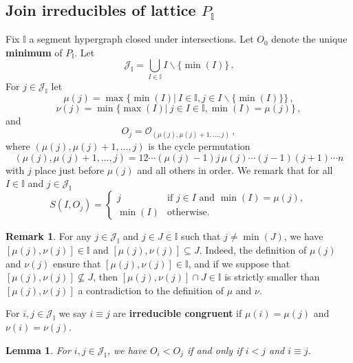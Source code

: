 \documentclass[reqno]{amsart}
\newtheorem{lemma}[theorem]{Lemma}
\theoremstyle{definition}
\newtheorem{remark}[theorem]{Remark}
\newcommand{\ssm}{\smallsetminus} %
\newcommand{\defn}[1]{\textbf{\textsf{\color{PineGreen} #1}}} %
\newcommand{\Or}{\mathcal O}  %
\newcommand{\II}{\mathbb I} %
\newcommand{\cJ}{\mathcal J} %
\begin{document}
\subsection{Join irreducibles of lattice $P_\II$}  
\label{subsec:irreducibles}

Fix $\II$ a segment hypergraph closed under intersections. 
Let $O_0$ denote the unique \defn{minimum} of $P_\II$.
Let
  $$\cJ_\II=\bigcup_{I\in \II} I\ssm \{\min(I)\} \,.$$
For $j\in \cJ_\II$ let
\begin{equation}\label{eq:mu}
 \mu(j)=\max\big\{ \min(I) \big| \ I\in\II, j\in I\ssm\{\min(I)\}\big\}\,,
\end{equation}
\begin{equation}\label{eq:nu}
 \nu(j)=\min\big\{ \max(I) \big| \ j\in I\in\II, \min(I)=\mu(j)\big\}\,,
\end{equation}
and
\begin{equation}\label{eq:nu}
 O_j=\Or_{(\mu(j),\mu(j)+1,\ldots,j)}\,,
\end{equation}
where $(\mu(j),\mu(j)+1,\ldots,j)$ is the cycle permutation
  $$(\mu(j),\mu(j)+1,\ldots,j)= 12\cdots(\mu(j)-1)j\,\mu(j)\cdots (j-1) (j+1)\cdots n
  $$
with $j$ place just before $\mu(j)$ and all others in order. We remark that for all $I\in\II$ and $j\in\cJ_\II$
\begin{equation}\label{eq:sourceOj}
 	S(I,O_j)=\begin{cases}
		j& \text{if $j\in I$ and $\min(I)=\mu(j)$},\\
		\min(I)& \text{otherwise.}
	\end{cases}
\end{equation}

\begin{remark}\label{rem:munuseg}
For any $j\in \cJ_\II$ and $j\in J\in \II$ such that $j\ne\min(J)$, we have $[\mu(j),\nu(j)]\in \II$ and $[\mu(j),\nu(j)]\subseteq J$.
Indeed, the definition of $\mu(j)$ and $\nu(j)$ ensure that $[\mu(j),\nu(j)]\in \II$, and if we suppose that $[\mu(j),\nu(j)]\not\subseteq J$, then $[\mu(j),\nu(j)]\cap J\in \II$ is strictly smaller than $[\mu(j),\nu(j)]$ a contradiction to the definition of $\mu$ and $\nu$.
\end{remark}

For $i,j\in \cJ_\II$ we say $i\equiv j$ are \defn{irreducible congruent} if $\mu(i)=\mu(j)$ and $\nu(i)=\nu(j)$.

\begin{lemma} \label{lem:irrorder}
 For $i,j\in \cJ_\II$, we have $O_i<O_j$ if and only if $i<j$ and $i\equiv j$.
\end{lemma}
\end{document}
